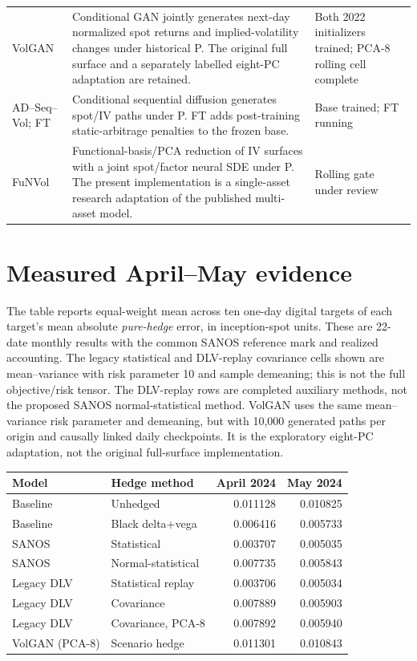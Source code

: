 \documentclass[10pt]{article}
\begin{document}
\begin{tabularx}{\linewidth}{@{}p{28mm}X p{29mm}@{}}
VolGAN & Conditional GAN jointly generates next-day normalized spot returns
and implied-volatility changes under historical P. The original full surface
and a separately labelled eight-PC adaptation are retained. & Both 2022
initializers trained; PCA-8 rolling cell complete \\
AD--Seq--Vol; FT & Conditional sequential diffusion generates spot/IV paths
under P. FT adds post-training static-arbitrage penalties to the frozen base.
& Base trained; FT running \\
FuNVol & Functional-basis/PCA reduction of IV surfaces with a joint spot/factor
neural SDE under P. The present implementation is a single-asset research
adaptation of the published multi-asset model. & Rolling gate under review \\
\bottomrule
\end{tabularx}

\section{Measured April--May evidence}

The table reports equal-weight mean across ten one-day digital targets of
each target's mean absolute \emph{pure-hedge} error, in inception-spot units.
These are 22-date monthly results with the common SANOS reference mark and
realized accounting. The legacy statistical and DLV-replay covariance cells
shown are mean--variance with risk parameter 10 and sample demeaning; this is
not the full objective/risk tensor. The DLV-replay rows are completed auxiliary methods,
not the proposed SANOS normal-statistical method. VolGAN uses the same
mean--variance risk parameter and demeaning, but with 10,000 generated paths
per origin and causally linked daily checkpoints. It is the exploratory
eight-PC adaptation, not the original full-surface implementation.

\begin{center}
\begin{tabular}{@{}llrr@{}}
\toprule
Model & Hedge method & April 2024 & May 2024 \\
\midrule
Baseline & Unhedged & 0.011128 & 0.010825 \\
Baseline & Black delta+vega & 0.006416 & 0.005733 \\
SANOS & Statistical & 0.003707 & 0.005035 \\
SANOS & Normal-statistical & 0.007735 & 0.005843 \\
Legacy DLV & Statistical replay & 0.003706 & 0.005034 \\
Legacy DLV & Covariance & 0.007889 & 0.005903 \\
Legacy DLV & Covariance, PCA-8 & 0.007892 & 0.005940 \\
VolGAN (PCA-8) & Scenario hedge & 0.011301 & 0.010843 \\
\bottomrule
\end{tabular}
\end{center}
\end{document}
